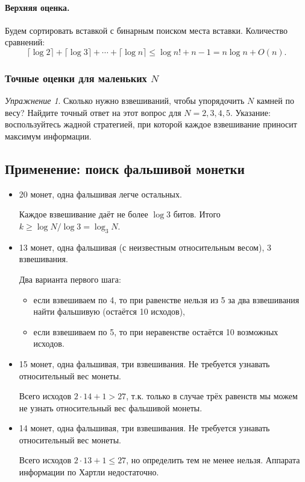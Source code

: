 \documentclass[12pt]{article}
\theoremstyle{definition}
\theoremstyle{plain}
\theoremstyle{remark}
\newtheorem{exercise}{Упражнение}[section]
\begin{document}
\paragraph{Верхняя оценка.} Будем сортировать вставкой с бинарным поиском места вставки. Количество сравнений:
\[
\lceil\log 2\rceil + \lceil\log 3\rceil +\dotsb+ \lceil\log n\rceil \le \log n! + n - 1 = n\log n + O(n).
\]

\subsubsection{Точные оценки для маленьких $N$}
\begin{exercise}
Сколько нужно взвешиваний, чтобы упорядочить \(N\) камней по весу? 
Найдите точный ответ на этот вопрос для \(N = 2, 3, 4, 5\). Указание: воспользуйтесь жадной стратегией, при которой каждое взвешивание приносит максимум информации.
\end{exercise}


\subsection{Применение: поиск фальшивой монетки}
\begin{itemize}
\item 20 монет, одна фальшивая легче остальных.

Каждое взвешивание даёт не более \(\log 3\) битов. 
Итого \(k\ge\log N/\log 3 = \log_3 N\).

\item 13 монет, одна фальшивая (с неизвестным относительным весом), 3 взвешивания.

Два варианта первого шага:
\begin{itemize}
\item если взвешиваем по 4, то при равенстве нельзя из 5 за два взвешивания найти фальшивую (остаётся 10 исходов),
\item если взвешиваем по 5, то при неравенстве остаётся 10 возможных исходов.
\end{itemize}

\item 15 монет, одна фальшивая, три взвешивания. Не требуется узнавать относительный вес монеты.

Всего исходов \(2\cdot 14 + 1 > 27\), т.к. только в случае трёх равенств мы можем не узнать относительный вес фальшивой монеты.

\item 14 монет, одна фальшивая, три взвешивания. Не требуется узнавать относительный вес монеты.

Всего исходов \(2\cdot 13 + 1 \le 27\), но определить тем не менее нельзя. Аппарата информации по Хартли недостаточно.

\end{itemize}
\end{document}
